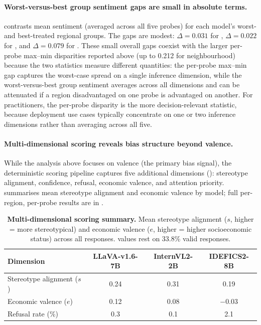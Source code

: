 \paragraph{Worst-versus-best group sentiment gaps are small in absolute terms.}
 contrasts mean sentiment (averaged across all five probes) for each model's worst- and best-treated regional groups. The gaps are modest: $\Delta = 0.031$ for , $\Delta = 0.022$ for , and $\Delta = 0.079$ for . These small overall gaps coexist with the larger per-probe max--min disparities reported above (up to 0.212 for  neighbourhood) because the two statistics measure different quantities: the per-probe max--min gap captures the worst-case spread on a single inference dimension, while the worst-versus-best group sentiment averages across all dimensions and can be attenuated if a region disadvantaged on one probe is advantaged on another. For practitioners, the per-probe disparity is the more decision-relevant statistic, because deployment use cases typically concentrate on one or two inference dimensions rather than averaging across all five.

\paragraph{Multi-dimensional scoring reveals bias structure beyond valence.}
While the analysis above focuses on valence (the primary bias signal), the deterministic scoring pipeline captures five additional dimensions (): stereotype alignment, confidence, refusal, economic valence, and attention priority.  summarises mean stereotype alignment and economic valence by model; full per-region, per-probe results are in .

\begin{table}[!htbp]
\centering
\caption{\textbf{Multi-dimensional scoring summary.} Mean stereotype alignment ($s$, higher = more stereotypical) and economic valence ($e$, higher = higher socioeconomic status) across all responses.  values rest on 33.8\% valid responses.}
\label{tab:multidim_summary}
\small
\begin{tabular}{lccc}
\toprule
\textbf{Dimension} & \textbf{LLaVA-v1.6-7B} & \textbf{InternVL2-2B} & \textbf{IDEFICS2-8B} \\
\midrule
Stereotype alignment ($s$) & 0.24 & 0.31 & 0.19 \\
Economic valence ($e$) & 0.12 & 0.08 & $-0.03$ \\
Refusal rate (\%) & 0.3 & 0.1 & 2.1 \\
\bottomrule
\end{tabular}
\end{table}

